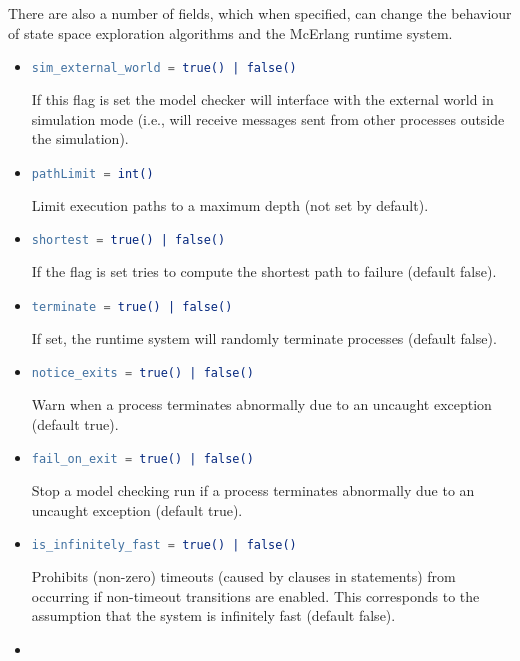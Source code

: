 \documentclass[a4paper]{article}
\begin{document}
There are also a number of fields, which when specified,
can change the behaviour of state space exploration algorithms
and the McErlang runtime system.
\begin{itemize}
\item
\begin{lstlisting}[language=Erlang]
sim_external_world = true() | false()
\end{lstlisting}
If this flag is set the model checker will
interface with the external world in simulation mode (i.e.,
will receive messages sent from other processes outside the simulation).
\item
\begin{lstlisting}[language=Erlang]
pathLimit = int()
\end{lstlisting}
Limit execution paths to a maximum depth (not set by default).
\item
\begin{lstlisting}[language=Erlang]
shortest = true() | false()
\end{lstlisting}
If the flag is set tries to compute the shortest path to failure
(default false).
\item
\begin{lstlisting}[language=Erlang]
terminate = true() | false()
\end{lstlisting}
If set, the runtime system will randomly terminate processes
(default false).
\item
\begin{lstlisting}[language=Erlang]
notice_exits = true() | false()
\end{lstlisting}
Warn when a process terminates abnormally due to an uncaught exception
(default true).
\item
\begin{lstlisting}[language=Erlang]
fail_on_exit = true() | false()
\end{lstlisting}
Stop a model checking run if a process
terminates abnormally due to an uncaught exception
(default true).
\item
\begin{lstlisting}[language=Erlang]
is_infinitely_fast = true() | false()
\end{lstlisting}
Prohibits (non-zero) timeouts (caused by \lstinline@after@ clauses in
\lstinline@receive@ statements) from occurring if
non-timeout transitions are enabled.
This corresponds to the assumption that the system
is infinitely fast (default false).
\item
\begin{lstlisting}[language=Erlang]

\end{lstlisting}
\end{itemize}
\end{document}
